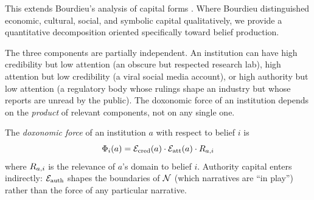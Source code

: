 This extends Bourdieu's analysis of capital forms \autocite{bourdieu1984, bourdieu1991}.
Where Bourdieu distinguished economic, cultural, social, and symbolic capital qualitatively, we provide a quantitative decomposition oriented specifically toward belief production.

The three components are partially independent.
An institution can have high credibility but low attention (an obscure but respected research lab), high attention but low credibility (a viral social media account), or high authority but low attention (a regulatory body whose rulings shape an industry but whose reports are unread by the public).
The doxonomic force of an institution depends on the \emph{product} of relevant components, not on any single one.

\begin{definition}
\label{def:doxonomic-force}
The \emph{doxonomic force} of an institution $a$ with respect to belief $i$ is
\[
  \Phi_i(a) = \mathcal{E}_{\text{cred}}(a) \cdot \mathcal{E}_{\text{att}}(a) \cdot R_{a,i}
\]
where $R_{a,i}$ is the relevance of $a$'s domain to belief $i$.
Authority capital enters indirectly: $\mathcal{E}_{\text{auth}}$ shapes the boundaries of $\mathcal{N}$ (which narratives are ``in play'') rather than the force of any particular narrative.
\end{definition}

